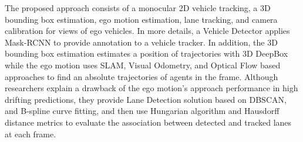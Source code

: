 \documentclass[10pt,a4paper]{report}
\begin{document}
The proposed approach consists of a monocular 2D vehicle tracking, a 3D bounding box estimation, ego motion estimation, lane tracking, and camera calibration for views of ego vehicles.
%
In more details, a Vehicle Detector applies Mask-RCNN to provide annotation to a vehicle tracker. 
%
In addition, the 3D bounding box estimation estimates a position of trajectories with 3D DeepBox while the ego motion uses SLAM, Visual Odometry, and Optical Flow based approaches to find an absolute trajectories of agents in the frame.
%
Although researchers explain a drawback of the ego motion's approach performance in high drifting predictions, they provide Lane Detection solution based on DBSCAN, and B-spline curve fitting, and then use Hungarian algorithm and Hausdorff distance metrics to evaluate the association between detected and tracked lanes at each frame.
%
%
\end{document}
